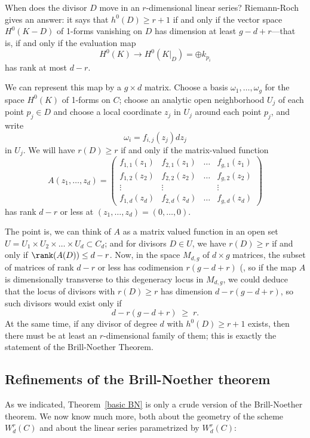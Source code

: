 When does the divisor $D$ move in an $r$-dimensional linear series? Riemann-Roch gives an answer: it says that $h^0(D) \geq r+1$ if and only if the vector space $H^0(K-D)$ of 1-forms vanishing on $D$ has dimension at least $g-d+r$---that is, if and only if the  evaluation map
$$
H^0(K) \to H^0(K|_D) = \oplus k_{p_i}
$$
has rank at most $d-r$. 

We can represent this map by a $g \times d$ matrix. Choose a basis $\omega_1,\dots,\omega_g$ for the space $H^0(K)$ of 1-forms on $C$; choose an analytic open neighborhood $U_j$ of each point $p_j \in D$ and choose a local coordinate $z_j$ in $U_j$ around each point $p_j$, and write
$$
\omega_i = f_{i,j}(z_j)dz_j
$$
in $U_j$. We will have $r(D) \geq r$ if and only if the  matrix-valued function
$$
A(z_1,\dots,z_d) = 
\begin{pmatrix}
f_{1,1}(z_1) & f_{2,1}(z_1) & \dots & f_{g,1}(z_1) \\
f_{1,2}(z_2) & f_{2,2}(z_2) & \dots & f_{g,2}(z_2) \\
\vdots & \vdots &  & \vdots \\
f_{1,d}(z_d) & f_{2,d}(z_d) & \dots & f_{g,d} (z_d)
\end{pmatrix}
$$
has rank $d-r$ or less at $(z_1,\dots,z_d) = (0,\dots,0)$.

The point is, we can think of $A$ as a matrix valued function in an open set $U = U_1 \times U_2 \times \dots \times U_d \subset C_d$; and for divisors $D \in U$, we have $r(D) \geq r$ if and only if $\rank(A(D)) \leq d-r$. Now, in the space $M_{d,g}$ of $d \times g$ matrices, the subset of matrices of rank $d-r$ or less has codimension $r(g-d+r)$ (\cite[Theorem ****]{Eisenbud1995},  so if the map $A$ is dimensionally transverse to this degeneracy locus in $M_{d,g}$, we could deduce that the locus of divisors with $r(D) \geq r$ has dimension $d - r(g-d+r)$, so such divisors would exist only if
$$
d - r(g-d+r) \; \geq \; r.
$$
At the same time, if any divisor of degree $d$ with $h^0(D) \geq r+1$ exists, then there must be at least an $r$-dimensional family of them; this is exactly the statement of the Brill-Noether Theorem.


\subsection{Refinements of the Brill-Noether theorem}

As we indicated, Theorem~\ref{basic BN} is only a crude version of the Brill-Noether theorem. We now know much more, both about the geometry of the scheme $W^r_d(C)$ and about the linear series parametrized by $W^r_d(C)$:

